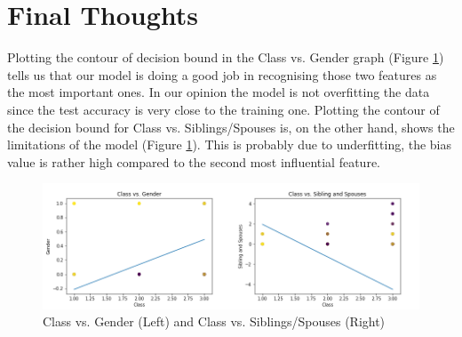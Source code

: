 \documentclass[10pt,a4paper]{report}
\begin{document}
\section{Final Thoughts}
Plotting the contour of decision bound in the Class vs. Gender graph (Figure \ref{fig:conc}) tells us that our model is doing a good job in recognising those two features as the most important ones. In our opinion the model is not overfitting the data since the test accuracy is very close to the training one. Plotting the contour of the decision bound for Class vs. Siblings/Spouses is, on the other hand, shows the limitations of the model (Figure \ref{fig:conc}). This is probably due to underfitting, the bias value is rather high compared to the second most influential feature.
\begin{figure}[!ht]
\centering
\includegraphics[width=\linewidth]{conc.png}
\caption{Class vs. Gender (Left) and Class vs. Siblings/Spouses (Right)}
\label{fig:conc}
\end{figure}   
\end{document}
